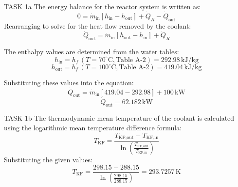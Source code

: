 TASK 1a  
The energy balance for the reactor system is written as:  
\[
0 = \dot{m}_{\text{in}} \left[ h_{\text{in}} - h_{\text{out}} \right] + \dot{Q}_R - \dot{Q}_{\text{out}}
\]  
Rearranging to solve for the heat flow removed by the coolant:  
\[
\dot{Q}_{\text{out}} = \dot{m}_{\text{in}} \left[ h_{\text{out}} - h_{\text{in}} \right] + \dot{Q}_R
\]  

The enthalpy values are determined from the water tables:  
\[
h_{\text{in}} = h_f \, (T = 70^\circ\text{C}, \text{Table A-2}) = 292.98 \, \text{kJ/kg}
\]  
\[
h_{\text{out}} = h_f \, (T = 100^\circ\text{C}, \text{Table A-2}) = 419.04 \, \text{kJ/kg}
\]  

Substituting these values into the equation:  
\[
\dot{Q}_{\text{out}} = \dot{m}_{\text{in}} \left[ 419.04 - 292.98 \right] + 100 \, \text{kW}
\]  
\[
\dot{Q}_{\text{out}} = 62.182 \, \text{kW}
\]  

TASK 1b  
The thermodynamic mean temperature of the coolant is calculated using the logarithmic mean temperature difference formula:  
\[
T_{\text{KF}} = \frac{T_{\text{KF,out}} - T_{\text{KF,in}}}{\ln \left( \frac{T_{\text{KF,out}}}{T_{\text{KF,in}}} \right)}
\]  
Substituting the given values:  
\[
T_{\text{KF}} = \frac{298.15 - 288.15}{\ln \left( \frac{298.15}{288.15} \right)} = 293.7257 \, \text{K}
\]